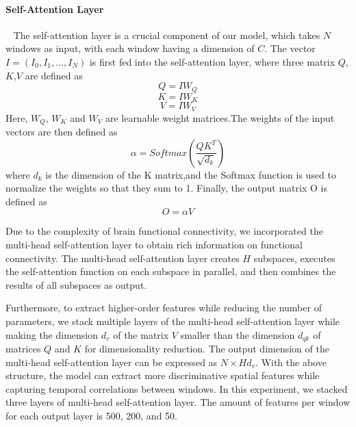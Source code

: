 \documentclass[a4paper]{cas-dc}
\begin{document}
\paragraph{Self-Attention Layer}~{}
\newline
\indent The self-attention layer is a crucial component of our model, which takes $N$ windows as input, with each window having a dimension of $C$. The vector $I = (I_0, I_1,..., I_N)$ is first fed into the self-attention layer, where three matrix $Q$,$K$,$V$ are defined as
\begin{equation}
	Q = IW_Q
\end{equation}
\begin{equation}
	K = IW_K
\end{equation}
\begin{equation}
	V = IW_V
\end{equation}
Here, $W_Q$, $W_K$ and $W_V$ are learnable weight matrices.The weights of the input vectors are then defined as
\begin{equation}
	\alpha = Softmax(\frac{QK^T}{\sqrt{d_k}})
\end{equation}
where $d_k$ is the dimension of the K matrix,and the Softmax function is used to normalize the weights so that they sum to 1. Finally, the output matrix O is defined as
\begin{equation}
	O = \alpha V
\end{equation}

Due to the complexity of brain functional connectivity, we incorporated the multi-head self-attention layer to obtain rich information on functional connectivity. The multi-head self-attention layer creates $H$ subspaces, executes the self-attention function on each subspace in parallel, and then combines the results of all subspaces as output.

Furthermore, to extract higher-order features while reducing the number of parameters, we stack multiple layers of the multi-head self-attention layer while making the dimension $d_v$ of the matrix $V$ smaller than the dimension $d_{qk}$ of matrices $Q$ and $K$ for dimensionality reduction. The output dimension of the multi-head self-attention layer can be expressed as $N\times Hd_v$. With the above structure, the model can extract more discriminative spatial features while capturing temporal correlations between windows. In this experiment, we stacked three layers of multi-head self-attention layer. The amount of features per window for each output layer is 500, 200, and 50.
\end{document}
